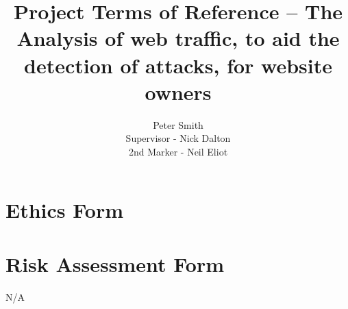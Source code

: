 \documentclass[12pt]{article}
\title{Project Terms of Reference -- The Analysis of web traffic, to aid the detection of attacks, for website owners}
\author{Peter Smith \\
\small Supervisor - Nick Dalton\\
\small 2nd Marker - Neil Eliot
}
\begin{document}
\maketitle


\printbibliography
\appendix
\newpage
\section{Ethics Form}





\section{Risk Assessment Form}
N/A


\end{document}
